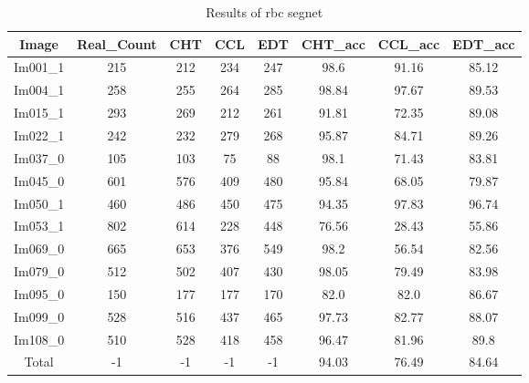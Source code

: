 \begin{table}[H]
    \centering
    \begin{tabular}{|c|c|c|c|c|c|c|c|}
    \hline
     \textbf{Image} & \textbf{Real\_Count} & \textbf{CHT} & \textbf{CCL} & \textbf{EDT} & \textbf{CHT\_acc} & \textbf{CCL\_acc} & \textbf{EDT\_acc} \\ \hline
     Im001\_1 & 215 & 212 & 234 & 247 & 98.6 & 91.16 & 85.12 \\ 
     Im004\_1 & 258 & 255 & 264 & 285 & 98.84 & 97.67 & 89.53 \\ 
     Im015\_1 & 293 & 269 & 212 & 261 & 91.81 & 72.35 & 89.08 \\ 
     Im022\_1 & 242 & 232 & 279 & 268 & 95.87 & 84.71 & 89.26 \\ 
     Im037\_0 & 105 & 103 & 75 & 88 & 98.1 & 71.43 & 83.81 \\ 
     Im045\_0 & 601 & 576 & 409 & 480 & 95.84 & 68.05 & 79.87 \\ 
     Im050\_1 & 460 & 486 & 450 & 475 & 94.35 & 97.83 & 96.74 \\ 
     Im053\_1 & 802 & 614 & 228 & 448 & 76.56 & 28.43 & 55.86 \\ 
     Im069\_0 & 665 & 653 & 376 & 549 & 98.2 & 56.54 & 82.56 \\ 
     Im079\_0 & 512 & 502 & 407 & 430 & 98.05 & 79.49 & 83.98 \\ 
     Im095\_0 & 150 & 177 & 177 & 170 & 82.0 & 82.0 & 86.67 \\ 
     Im099\_0 & 528 & 516 & 437 & 465 & 97.73 & 82.77 & 88.07 \\ 
     Im108\_0 & 510 & 528 & 418 & 458 & 96.47 & 81.96 & 89.8 \\ \hline
     Total & -1 & -1 & -1 & -1 & 94.03 & 76.49 & 84.64 \\ 
    
    \hline
    \end{tabular}
    \caption{Results of rbc segnet}
    \label{Results of rbc segnet}
    \end{table}
    